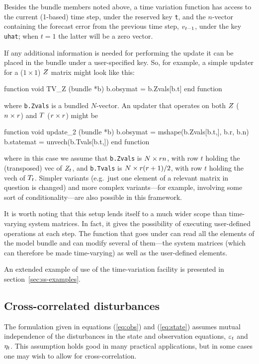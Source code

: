 Besides the bundle members noted above, a time variation function has
access to the current (1-based) time step, under the reserved key
\texttt{t}, and the $n$-vector containing the forecast error from the
previous time step, $v_{t-1}$, under the key \texttt{uhat};
when $t=1$ the latter will be a zero vector.

If any additional information is needed for performing the update it
can be placed in the bundle under a user-specified key.  So, for
example, a simple updater for a ($1 \times 1$) $Z$ matrix might
look like this:
%
\begin{code}
function void TV_Z (bundle *b)
    b.obsymat = b.Zvals[b.t]
end function
\end{code}
%
where \texttt{b.Zvals} is a bundled $N$-vector. An updater that
operates on both $Z$ ($n \times r$) and $T$
($r \times r$) might be
%
\begin{code}
function void update_2 (bundle *b)
    b.obsymat = mshape(b.Zvals[b.t,], b.r, b.n)
    b.statemat = unvech(b.Tvals[b.t,])
end function
\end{code}
%
where in this case we assume that \texttt{b.Zvals} is
$N \times rn$, with row $t$ holding the (transposed) vec of
$Z_t$, and \texttt{b.Tvals} is $N \times r(r +1)/2$,
with row $t$ holding the vech of $T_t$. Simpler variants
(e.g.\ just one element of a relevant matrix in question is changed)
and more complex variants---for example, involving some sort of
conditionality---are also possible in this framework.

It is worth noting that this setup lends itself to a much wider scope
than time-varying system matrices. In fact, it gives the possibility
of executing user-defined operations at each step. The function that
goes under  can read all the elements of the model
bundle and can modify several of them---the system matrices (which can
therefore be made time-varying) as well as the user-defined elements.

An extended example of use of the time-variation facility is presented
in section~\ref{sec:ss-examples}.

\subsection{Cross-correlated disturbances}
\label{sec:crossd}

The formulation given in equations (\ref{eq:obs}) and (\ref{eq:state})
assumes mutual independence of the disturbances in the state and
observation equations, $\varepsilon_t$ and $\eta_t$.  This assumption
holds good in many practical applications, but in some cases one may
wish to allow for cross-correlation.

